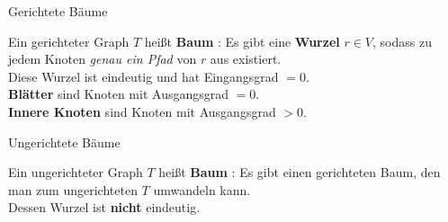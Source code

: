 


\begin{frame}{Gerichtete Bäume}
	\begin{Definition}
		Ein gerichteter Graph $T$ heißt \textbf{Baum} :{\Gdw} Es gibt eine \textbf{Wurzel} $r \in V$, sodass zu jedem Knoten \emph{genau ein Pfad} von $r$ aus existiert. \\
		\smallskip
		Diese Wurzel ist eindeutig und hat Eingangsgrad $= 0$. \\
		\textbf{Blätter} sind Knoten mit Ausgangsgrad $= 0$. \\
		\textbf{Innere Knoten} sind Knoten mit Ausgangsgrad $> 0$. 
		
	\end{Definition}
\end{frame}

\begin{frame}{Ungerichtete Bäume}
	\begin{Definition}
		Ein ungerichteter Graph $T$ heißt \textbf{Baum} :{\Gdw} Es gibt einen gerichteten Baum, den man zum ungerichteten $T$ umwandeln kann. \\
		\smallskip
		Dessen Wurzel ist \textbf{nicht} eindeutig.
		
	\end{Definition}
\end{frame}

